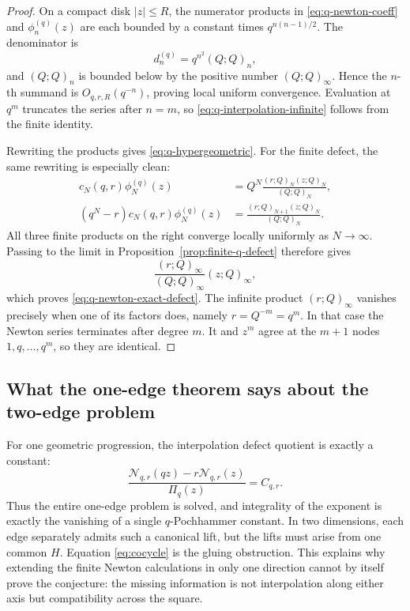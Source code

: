 \documentclass[11pt]{article}
\theoremstyle{definition}
\begin{document}
\begin{proof}
On a compact disk \(|z|\le R\), the numerator products in \eqref{eq:q-newton-coeff} and \(\phi_n^{(q)}(z)\) are each bounded by a constant times \(q^{n(n-1)/2}\).  The denominator is
\[
  d_n^{(q)}=q^{n^2}(Q;Q)_n,
\]
and \((Q;Q)_n\) is bounded below by the positive number \((Q;Q)_\infty\).  Hence the \(n\)-th summand is \(O_{q,r,R}(q^{-n})\), proving local uniform convergence.  Evaluation at \(q^m\) truncates the series after \(n=m\), so \eqref{eq:q-interpolation-infinite} follows from the finite identity.

Rewriting the products gives \eqref{eq:q-hypergeometric}.  For the finite defect, the same rewriting is especially clean:
\begin{align*}
 c_N(q,r)\phi_N^{(q)}(z)
   &=Q^N\frac{(r;Q)_N(z;Q)_N}{(Q;Q)_N},\\
 (q^N-r)c_N(q,r)\phi_N^{(q)}(z)
   &=\frac{(r;Q)_{N+1}(z;Q)_N}{(Q;Q)_N}.
\end{align*}
All three finite products on the right converge locally uniformly as \(N\to\infty\).  Passing to the limit in Proposition~\ref{prop:finite-q-defect} therefore gives
\[
  \frac{(r;Q)_\infty}{(Q;Q)_\infty}(z;Q)_\infty,
\]
which proves \eqref{eq:q-newton-exact-defect}.  The infinite product \((r;Q)_\infty\) vanishes precisely when one of its factors does, namely \(r=Q^{-m}=q^m\).  In that case the Newton series terminates after degree \(m\).  It and \(z^m\) agree at the \(m+1\) nodes \(1,q,\ldots,q^m\), so they are identical.
\end{proof}

\subsection{What the one-edge theorem says about the two-edge problem}

For one geometric progression, the interpolation defect quotient is exactly a constant:
\[
  \frac{\mathcal N_{q,r}(qz)-r\mathcal N_{q,r}(z)}{\Pi_q(z)}=C_{q,r}.
\]
Thus the entire one-edge problem is solved, and integrality of the exponent is exactly the vanishing of a single \(q\)-Pochhammer constant.  In two dimensions, each edge separately admits such a canonical lift, but the lifts must arise from one common \(H\).  Equation \eqref{eq:cocycle} is the gluing obstruction.  This explains why extending the finite Newton calculations in only one direction cannot by itself prove the conjecture: the missing information is not interpolation along either axis but compatibility across the square.
\end{document}
